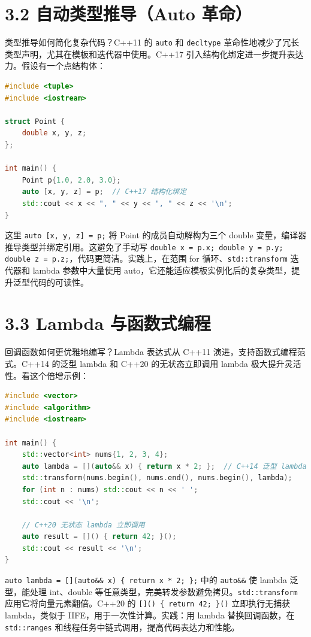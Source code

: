 \section{3.2 自动类型推导（Auto 革命）}
类型推导如何简化复杂代码？C++11 的 \texttt{auto} 和 \texttt{decltype} 革命性地减少了冗长类型声明，尤其在模板和迭代器中使用。C++17 引入结构化绑定进一步提升表达力。假设有一个点结构体：\par
\begin{lstlisting}[language=cpp]
#include <tuple>
#include <iostream>

struct Point {
    double x, y, z;
};

int main() {
    Point p{1.0, 2.0, 3.0};
    auto [x, y, z] = p;  // C++17 结构化绑定
    std::cout << x << ", " << y << ", " << z << '\n';
}
\end{lstlisting}
这里 \texttt{auto [x, y, z] = p;} 将 Point 的成员自动解构为三个 double 变量，编译器推导类型并绑定引用。这避免了手动写 \texttt{double x = p.x; double y = p.y; double z = p.z;}，代码更简洁。实践上，在范围 for 循环、\texttt{std::transform} 迭代器和 lambda 参数中大量使用 auto，它还能适应模板实例化后的复杂类型，提升泛型代码的可读性。\par
\section{3.3 Lambda 与函数式编程}
回调函数如何更优雅地编写？Lambda 表达式从 C++11 演进，支持函数式编程范式。C++14 的泛型 lambda 和 C++20 的无状态立即调用 lambda 极大提升灵活性。看这个倍增示例：\par
\begin{lstlisting}[language=cpp]
#include <vector>
#include <algorithm>
#include <iostream>

int main() {
    std::vector<int> nums{1, 2, 3, 4};
    auto lambda = [](auto&& x) { return x * 2; };  // C++14 泛型 lambda
    std::transform(nums.begin(), nums.end(), nums.begin(), lambda);
    for (int n : nums) std::cout << n << ' ';
    std::cout << '\n';

    // C++20 无状态 lambda 立即调用
    auto result = []() { return 42; }();
    std::cout << result << '\n';
}
\end{lstlisting}
\texttt{auto lambda = [](auto\&{}\&{} x) \{{} return x * 2; \}{};} 中的 \texttt{auto\&{}\&{}} 使 lambda 泛型，能处理 int、double 等任意类型，完美转发参数避免拷贝。\texttt{std::transform} 应用它将向量元素翻倍。C++20 的 \texttt{[]() \{{} return 42; \}{}()} 立即执行无捕获 lambda，类似于 IIFE，用于一次性计算。实践：用 lambda 替换回调函数，在 \texttt{std::ranges} 和线程任务中链式调用，提高代码表达力和性能。\par
